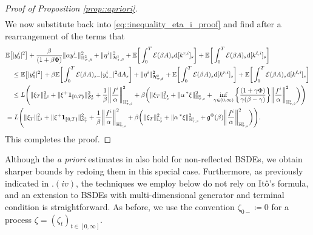 \documentclass[10pt]{article} %
\newcommand\cE{\mathcal E}
\newcommand\cH{\mathcal H}
\newcommand\cS{\mathcal S}
\newcommand{\smalltext}[1]{\text{\fontsize{4}{4}\selectfont$#1$}}
\newcommand\fg{\mathfrak g}
\def \E{\mathbb{E}}
\def \H{\mathbb{H}}
\def \L{\mathbb{L}}
\newcommand{\brs}[1]{\prescript{\ast}{}{#1}}
\newcommand{\1}{\mathbf{1}}
\def\d{\mathrm{d}}
\begin{document}
\begin{proof}[Proof of Proposition \ref{prop::apriori}]
\begin{align*}
\end{align*}
We now substitute back into \eqref{eq::inequality_eta_i_proof} and find after a rearrangement of the terms that
\begin{align*}
	&\E\big[|y^i_0|^2\big] + \frac{\beta}{(1+\beta\Phi)}\|\alpha y^i_{-}\|^2_{\H^2_{T,\beta}} + \|\eta^i\|^2_{\cH^\smalltext{2}_{\smalltext{T}\smalltext{,}\beta}} + \E\bigg[\int_0^T \cE(\beta A)_s \d[k^{r,i}]_s\bigg] + \E\bigg[\int_0^T \cE(\beta A)_s \d[k^{\ell,i}]_s\bigg] \\
	&\quad\leq \E\big[|y^i_0|^2\big] + \beta\E\bigg[\int_0^T\cE(\beta A)_{s-}|y^i_{s-}|^2 \d A_s\bigg] + \|\eta^i\|^2_{\cH^\smalltext{2}_{\smalltext{T}\smalltext{,}\beta}} + \E\bigg[\int_0^T \cE(\beta A)_s \d[k^{r,i}]_s\bigg] + \E\bigg[\int_0^T \cE(\beta A)_s \d[k^{\ell,i}]_s\bigg] \\
	&\quad\leq L\Bigg( \|\xi_T\|^2_{\L^\smalltext{2}} + \|\xi^+\1_{\llbracket 0,T\rrparenthesis}\|^2_{\cS^\smalltext{2}_\smalltext{T}} + \frac{1}{\beta} \bigg\|\frac{f^i}{\alpha}\bigg\|^2_{\H^\smalltext{2}_{\smalltext{T}\smalltext{,}\smalltext{\beta}}} + \beta\bigg(\|\xi_T\|^2_{\L^\smalltext{2}_\smalltext{\beta}} + \| \alpha\brs{\xi}\|^2_{\H^\smalltext{2}_{\smalltext{T}\smalltext{,}\smalltext{\beta}}} + \inf_{\gamma \in (0,\infty)} \bigg\{\frac{(1+\gamma\Phi)}{\gamma(\beta-\gamma)}\bigg\} \bigg\|\frac{f^i}{\alpha}\bigg\|^2_{\H^\smalltext{2}_{\smalltext{T}\smalltext{,}\smalltext{\beta}}}\bigg)\Bigg) \\
	&= L\Bigg( \|\xi_T\|^2_{\L^\smalltext{2}} + \|\xi^+\1_{\llbracket 0,T\rrparenthesis}\|^2_{\cS^\smalltext{2}_\smalltext{T}} + \frac{1}{\beta} \bigg\|\frac{f^i}{\alpha}\bigg\|^2_{\H^\smalltext{2}_{\smalltext{T}\smalltext{,}\smalltext{\beta}}} + \beta\bigg(\|\xi_T\|^2_{\L^\smalltext{2}_\smalltext{\beta}} + \| \alpha\brs{\xi}\|^2_{\H^\smalltext{2}_{\smalltext{T}\smalltext{,}\smalltext{\beta}}} + \fg^\Phi(\beta) \bigg\|\frac{f^i}{\alpha}\bigg\|^2_{\H^\smalltext{2}_{\smalltext{T}\smalltext{,}\smalltext{\beta}}}\bigg)\Bigg).
\end{align*}
This completes the proof.
\end{proof}

Although the \emph{a priori} estimates in  also hold for non-reflected BSDEs, we obtain sharper bounds by redoing them in this special case. Furthermore, as previously indicated in .$(iv)$, the techniques we employ below do not rely on It\^o's formula, and an extension to BSDEs with multi-dimensional generator and terminal condition is straightforward. As before, we use the convention $\zeta_{0-} \coloneqq 0$ for a process $\zeta =(\zeta_t)_{t \in [0,\infty]}$.
\end{document}
